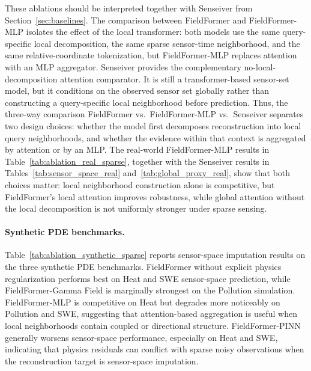 These ablations should be interpreted together with Senseiver from Section~\ref{sec:baselines}. The comparison between FieldFormer and FieldFormer-MLP isolates the effect of the local transformer: both models use the same query-specific local decomposition, the same sparse sensor-time neighborhood, and the same relative-coordinate tokenization, but FieldFormer-MLP replaces attention with an MLP aggregator. Senseiver provides the complementary no-local-decomposition attention comparator. It is still a transformer-based sensor-set model, but it conditions on the observed sensor set globally rather than constructing a query-specific local neighborhood before prediction. Thus, the three-way comparison FieldFormer vs.\ FieldFormer-MLP vs.\ Senseiver separates two design choices: whether the model first decomposes reconstruction into local query neighborhoods, and whether the evidence within that context is aggregated by attention or by an MLP. The real-world FieldFormer-MLP results in Table~\ref{tab:ablation_real_sparse}, together with the Senseiver results in Tables~\ref{tab:sensor_space_real} and~\ref{tab:global_proxy_real}, show that both choices matter: local neighborhood construction alone is competitive, but FieldFormer's local attention improves robustness, while global attention without the local decomposition is not uniformly stronger under sparse sensing.

\paragraph{Synthetic PDE benchmarks.}
Table~\ref{tab:ablation_synthetic_sparse} reports sensor-space imputation results on the three synthetic PDE benchmarks. FieldFormer without explicit physics regularization performs best on Heat and SWE sensor-space prediction, while FieldFormer-Gamma Field is marginally strongest on the Pollution simulation. FieldFormer-MLP is competitive on Heat but degrades more noticeably on Pollution and SWE, suggesting that attention-based aggregation is useful when local neighborhoods contain coupled or directional structure. FieldFormer-PINN generally worsens sensor-space performance, especially on Heat and SWE, indicating that physics residuals can conflict with sparse noisy observations when the reconstruction target is sensor-space imputation.

